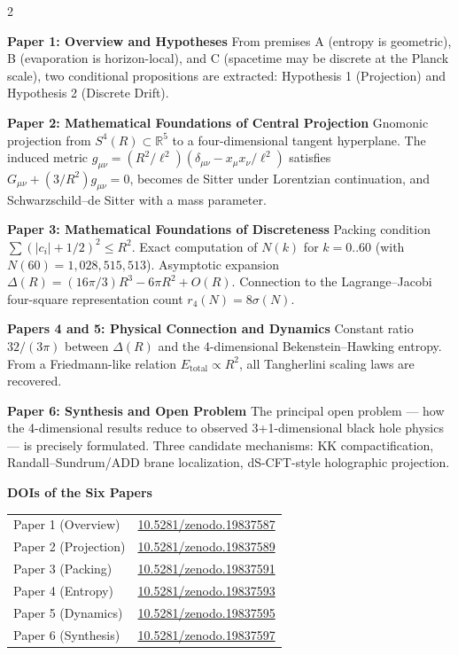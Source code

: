 \documentclass[9pt,a4paper]{article}
\begin{document}
\begin{multicols}{2}
\small

\textbf{Paper 1: Overview and Hypotheses}\enspace
From premises A (entropy is geometric), B (evaporation is horizon-local), and C (spacetime may be discrete at the Planck scale), two conditional propositions are extracted: Hypothesis 1 (Projection) and Hypothesis 2 (Discrete Drift).

\smallskip
\textbf{Paper 2: Mathematical Foundations of Central Projection}\enspace
Gnomonic projection from $S^4(R) \subset \mathbb{R}^5$ to a four-dimensional tangent hyperplane. The induced metric $g_{\mu\nu} = (R^2/\ell^2)(\delta_{\mu\nu} - x_\mu x_\nu/\ell^2)$ satisfies $G_{\mu\nu} + (3/R^2)g_{\mu\nu} = 0$, becomes de Sitter under Lorentzian continuation, and Schwarzschild--de Sitter with a mass parameter.

\smallskip
\textbf{Paper 3: Mathematical Foundations of Discreteness}\enspace
Packing condition $\sum (|c_i|+1/2)^2 \le R^2$. Exact computation of $N(k)$ for $k = 0..60$ (with $N(60) = 1{,}028{,}515{,}513$). Asymptotic expansion $\Delta(R) = (16\pi/3)R^3 - 6\pi R^2 + O(R)$. Connection to the Lagrange--Jacobi four-square representation count $r_4(N) = 8\sigma(N)$.

\smallskip
\textbf{Papers 4 and 5: Physical Connection and Dynamics}\enspace
Constant ratio $32/(3\pi)$ between $\Delta(R)$ and the 4-dimensional Bekenstein--Hawking entropy. From a Friedmann-like relation $E_{\mathrm{total}} \propto R^2$, all Tangherlini scaling laws are recovered.

\smallskip
\textbf{Paper 6: Synthesis and Open Problem}\enspace
The principal open problem --- how the 4-dimensional results reduce to observed 3+1-dimensional black hole physics --- is precisely formulated. Three candidate mechanisms: KK compactification, Randall--Sundrum/ADD brane localization, dS-CFT-style holographic projection.

\vspace{6pt}
\textbf{DOIs of the Six Papers}

\vspace{1pt}
{\footnotesize
\begin{tabular}{@{}ll@{}}
Paper 1 (Overview)  & \href{https://doi.org/10.5281/zenodo.19837587}{10.5281/zenodo.19837587} \\
Paper 2 (Projection) & \href{https://doi.org/10.5281/zenodo.19837589}{10.5281/zenodo.19837589} \\
Paper 3 (Packing) & \href{https://doi.org/10.5281/zenodo.19837591}{10.5281/zenodo.19837591} \\
Paper 4 (Entropy) & \href{https://doi.org/10.5281/zenodo.19837593}{10.5281/zenodo.19837593} \\
Paper 5 (Dynamics) & \href{https://doi.org/10.5281/zenodo.19837595}{10.5281/zenodo.19837595} \\
Paper 6 (Synthesis) & \href{https://doi.org/10.5281/zenodo.19837597}{10.5281/zenodo.19837597} \\
\end{tabular}
}


\end{multicols}
\end{document}
